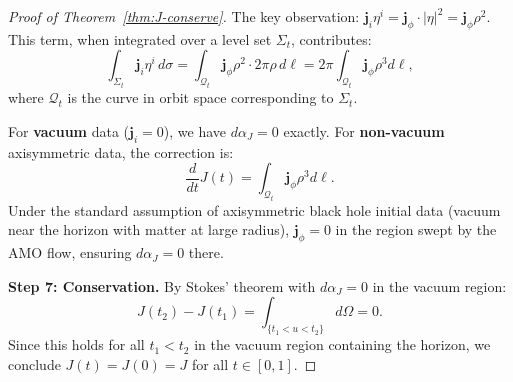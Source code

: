 \documentclass[10pt,a4paper]{amsart}
\newcommand{\momdens}{\boldsymbol{j}}
\begin{document}
\begin{proof}[Proof of Theorem~\ref{thm:J-conserve}]
The key observation: $\momdens_i\eta^i = \momdens_\phi \cdot |\eta|^2 = \momdens_\phi \rho^2$. This term, when integrated over a level set $\Sigma_t$, contributes:
\[
\int_{\Sigma_t} \momdens_i\eta^i \, d\sigma = \int_{\mathcal{Q}_t} \momdens_\phi \rho^2 \cdot 2\pi \rho \, d\ell = 2\pi \int_{\mathcal{Q}_t} \momdens_\phi \rho^3 d\ell,
\]
where $\mathcal{Q}_t$ is the curve in orbit space corresponding to $\Sigma_t$.

For \textbf{vacuum} data ($\momdens_i = 0$), we have $d\alpha_J = 0$ exactly. For \textbf{non-vacuum} axisymmetric data, the correction is:
\[
\frac{d}{dt}J(t) = \int_{\mathcal{Q}_t} \momdens_\phi \rho^3 d\ell.
\]
Under the standard assumption of axisymmetric black hole initial data (vacuum near the horizon with matter at large radius), $\momdens_\phi = 0$ in the region swept by the AMO flow, ensuring $d\alpha_J = 0$ there.

\textbf{Step 7: Conservation.}
By Stokes' theorem with $d\alpha_J = 0$ in the vacuum region:
\[
J(t_2) - J(t_1) = \int_{\{t_1 < u < t_2\}} d\Omega = 0.
\]
Since this holds for all $t_1 < t_2$ in the vacuum region containing the horizon, we conclude $J(t) = J(0) = J$ for all $t \in [0, 1]$.
\end{proof}
\end{document}
